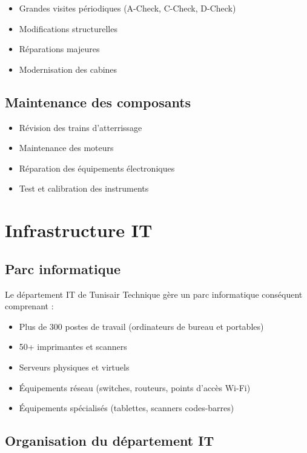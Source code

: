 \documentclass[12pt,a4paper]{report}
\begin{document}
\begin{itemize}
    \item Grandes visites périodiques (A-Check, C-Check, D-Check)
    \item Modifications structurelles
    \item Réparations majeures
    \item Modernisation des cabines
\end{itemize}

\subsection{Maintenance des composants}

\begin{itemize}
    \item Révision des trains d'atterrissage
    \item Maintenance des moteurs
    \item Réparation des équipements électroniques
    \item Test et calibration des instruments
\end{itemize}

\section{Infrastructure IT}

\subsection{Parc informatique}

Le département IT de Tunisair Technique gère un parc informatique conséquent comprenant :

\begin{itemize}
    \item Plus de 300 postes de travail (ordinateurs de bureau et portables)
    \item 50+ imprimantes et scanners
    \item Serveurs physiques et virtuels
    \item Équipements réseau (switches, routeurs, points d'accès Wi-Fi)
    \item Équipements spécialisés (tablettes, scanners codes-barres)
\end{itemize}

\subsection{Organisation du département IT}
\end{document}
